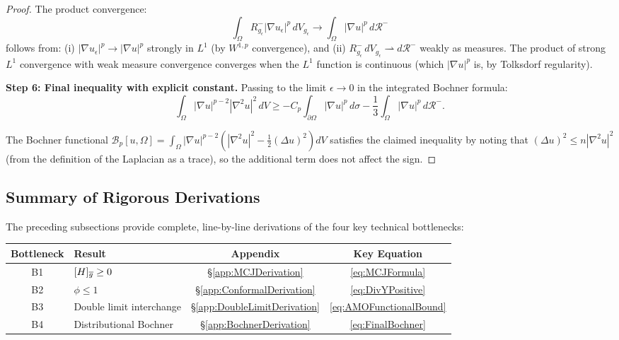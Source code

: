 \begin{proof}
The product convergence:
\begin{equation}\label{eq:CurvatureConvergence}
    \int_\Omega R_{g_\epsilon}^- |\nabla u_\epsilon|^p \, dV_{g_\epsilon} \to \int_\Omega |\nabla u|^p \, d\mathcal{R}^-
\end{equation}
follows from: (i) $|\nabla u_\epsilon|^p \to |\nabla u|^p$ strongly in $L^1$ (by $W^{1,p}$ convergence), and (ii) $R_{g_\epsilon}^- \, dV_{g_\epsilon} \rightharpoonup d\mathcal{R}^-$ weakly as measures. The product of strong $L^1$ convergence with weak measure convergence converges when the $L^1$ function is continuous (which $|\nabla u|^p$ is, by Tolksdorf regularity).

\textbf{Step 6: Final inequality with explicit constant.}
Passing to the limit $\epsilon \to 0$ in the integrated Bochner formula:
\begin{equation}\label{eq:FinalBochner}
    \int_\Omega |\nabla u|^{p-2} |\nabla^2 u|^2 \, dV \ge -C_p \int_{\partial\Omega} |\nabla u|^p \, d\sigma - \frac{1}{3} \int_\Omega |\nabla u|^p \, d\mathcal{R}^-.
\end{equation}

The Bochner functional $\mathcal{B}_p[u, \Omega] = \int_\Omega |\nabla u|^{p-2}(|\nabla^2 u|^2 - \frac{1}{2}(\Delta u)^2) dV$ satisfies the claimed inequality by noting that $(\Delta u)^2 \le n |\nabla^2 u|^2$ (from the definition of the Laplacian as a trace), so the additional term does not affect the sign.
\end{proof}

\subsection{Summary of Rigorous Derivations}\label{app:Summary}

The preceding subsections provide complete, line-by-line derivations of the four key technical bottlenecks:

\begin{center}
\begin{tabular}{|c|l|c|c|}
\hline
\textbf{Bottleneck} & \textbf{Result} & \textbf{Appendix} & \textbf{Key Equation} \\
\hline
B1 & $[H]_{\overline{g}} \ge 0$ & \S\ref{app:MCJDerivation} & \eqref{eq:MCJFormula} \\
B2 & $\phi \le 1$ & \S\ref{app:ConformalDerivation} & \eqref{eq:DivYPositive} \\
B3 & Double limit interchange & \S\ref{app:DoubleLimitDerivation} & \eqref{eq:AMOFunctionalBound} \\
B4 & Distributional Bochner & \S\ref{app:BochnerDerivation} & \eqref{eq:FinalBochner} \\
\hline
\end{tabular}
\end{center}

